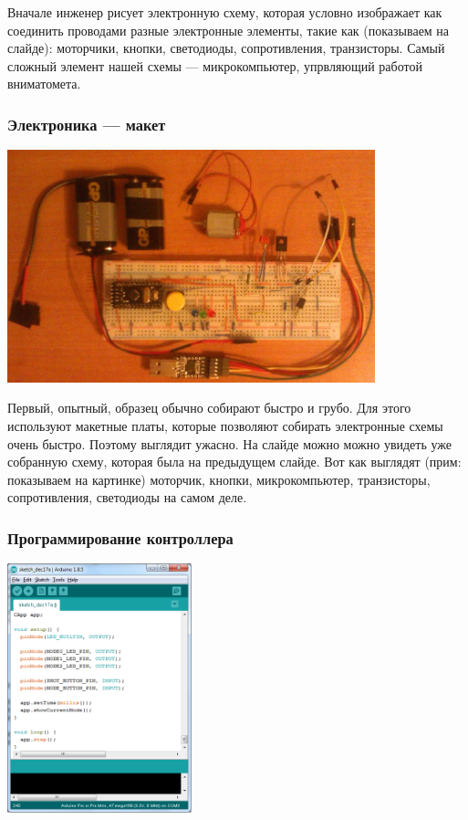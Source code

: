Вначале инженер рисует электронную схему, которая условно изображает как соединить проводами разные электронные элементы, такие как (показываем на слайде): моторчики, кнопки, светодиоды, сопротивления, транзисторы. Самый сложный элемент нашей схемы --- микрокомпьютер, упрвляющий работой вниматомета.

\begin{frame}
    \frametitle{Электроника {\myDevice} --- макет}
    
    \begin{center}
        \includegraphics[width=0.8\textwidth]{fig/eModel}
    \end{center}
\end{frame}

Первый, опытный, образец обычно собирают быстро и грубо. Для этого используют макетные платы, которые позволяют собирать электронные схемы очень быстро. Поэтому {\myDevice} выглядит ужасно. На слайде можно можно увидеть уже собранную схему, которая была на предыдущем слайде. Вот как выглядят (прим: показываем на картинке) моторчик, кнопки, микрокомпьютер, транзисторы, сопротивления, светодиоды на самом деле.

\begin{frame}
    \frametitle{Программирование контроллера \myDevice}
    
    \begin{center}
        \includegraphics[width=0.4\textwidth]{fig/programming}
    \end{center}
\end{frame}


